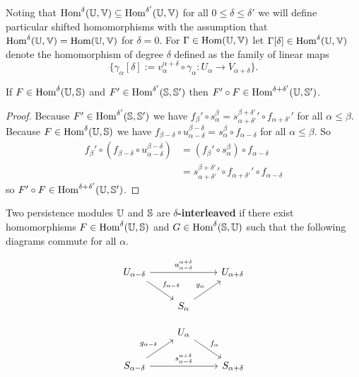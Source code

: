 Noting that $\Hom^\delta(\U,\V)\subseteq\Hom^{\delta'}(\U,\V)$ for all $0\leq\delta\leq\delta'$ we will define particular shifted homomorphisms with the assumption that $\Hom^\delta(\U,\V) = \Hom(\U,\V)$ for $\delta = 0$.
For $\Gamma\in\Hom(\U,\V)$ let $\Gamma[\delta]\in\Hom^\delta(\U,\V)$ denote the homomorphism of degree $\delta$ defined as the family of linear maps
\[\{\gamma_\alpha[\delta] := v_\alpha^{\alpha+\delta}\circ \gamma_\alpha : U_\alpha\to V_{\alpha+\delta}\}.\]

\begin{lemma}\label{lem:trans_shift}
  If $F\in \Hom^\delta(\U,\S)$ and $F'\in\Hom^{\delta'}(\S,\S')$ then $F'\circ F\in\Hom^{\delta+\delta'}(\U,\S')$.
\end{lemma}
\begin{proof}
  Because $F'\in \Hom^{\delta'}(\S,\S')$ we have $f_{\beta}'\circ s_\alpha^\beta = {s_{\alpha+\delta'}^{\beta+\delta'}}'\circ f_{\alpha+\delta'}'$ for all $\alpha\leq\beta$.
  Because $F\in\Hom^\delta(\U,\S)$ we have $f_{\beta-\delta}\circ u_{\alpha-\delta}^{\beta-\delta} = s_\alpha^\beta\circ f_{\alpha-\delta}$ for all $\alpha\leq\beta$.
  So
  \begin{align*}
    f_{\beta}'\circ (f_{\beta-\delta}\circ u_{\alpha-\delta}^{\beta-\delta})
      &= (f_{\beta}'\circ s_\alpha^\beta)\circ f_{\alpha-\delta}\\
      &= {s_{\alpha+\delta'}^{\beta+\delta'}}'\circ f_{\alpha+\delta'}'\circ f_{\alpha-\delta}
  \end{align*}
  so $F'\circ F\in\Hom^{\delta+\delta'}(\U,\S')$.
\end{proof}

\begin{definition}[Interleaving]
  Two persistence modules $\U$ and $\S$ are \textbf{$\delta$-interleaved} if there exist homomorphisms $F\in\Hom^\delta(\U, \S)$ and $G \in\Hom^\delta(\S,\U)$ such that the following diagrams commute for all $\alpha$.

  \begin{minipage}{0.45\textwidth}
  \begin{equation}\label{dgm:interleaving1}
    \begin{tikzcd}
      U_{\alpha-\delta}\arrow{rr}{u_{\alpha-\delta}^{\alpha+\delta}}\arrow{dr}{f_{\alpha-\delta}} & &
      U_{\alpha+\delta}\\
      & S_{\alpha}\arrow{ur}{g_\alpha} &
  \end{tikzcd}\end{equation}
  \end{minipage}
  \begin{minipage}{0.45\textwidth}
  \begin{equation}\label{dgm:interleaving2}
    \begin{tikzcd}
      & U_{\alpha}\arrow{dr}{f_\alpha} &\\
      S_{\alpha-\delta}\arrow{rr}{s_{\alpha-\delta}^{\alpha+\delta}}\arrow{ur}{g_{\alpha-\delta}} & &
      S_{\alpha+\delta}
  \end{tikzcd}\end{equation}
  \end{minipage}
\end{definition}

